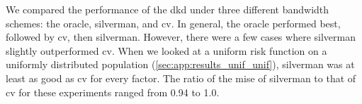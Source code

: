 


We compared the performance of the \gls{dkd} under three different bandwidth schemes:
the \gls{oracle}, \gls{silverman}, and \gls{cv}.
In general, the \gls{oracle} performed best, followed by \gls{cv}, then \gls{silverman}.
However, there were a few cases where \gls{silverman} slightly outperformed \gls{cv}.
When we looked at a uniform risk function on a uniformly distributed population (\cref{sec:app:results_unif_unif}), \gls{silverman} was at least as good as \gls{cv} for every \gls{factor}.
The ratio of the \gls{mise} of \gls{silverman} to that of \gls{cv} for these experiments ranged from 0.94 to 1.0.

